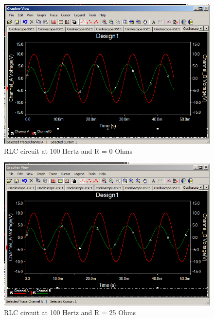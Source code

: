 \documentclass[12pt]{article}
\begin{document}
\begin{figure}[h!] %
   \centering
   \includegraphics[width=5in]{100hz_0r.PNG} 
   \caption{RLC circuit at 100 Hertz and R = 0 Ohms}
   \label{fig:example}
\end{figure}

\newpage

\begin{figure}[h!] %
   \centering
   \includegraphics[width=5in]{100hz_25r.PNG} 
   \caption{RLC circuit at 100 Hertz and R = 25 Ohms}
   \label{fig:example}
\end{figure}
\bigskip
\end{document}
